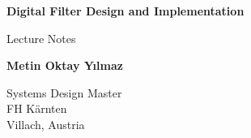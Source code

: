 \begin{titlepage}
	\begin{center}
		\vspace*{1cm}

		\textbf{\Large Digital Filter Design and Implementation}

		\vspace{0.5cm}
		\large Lecture Notes

		\vspace{1.5cm}

		\textbf{Metin Oktay Yılmaz}

		\vspace{15cm}


		Systems Design Master\\
		FH K\"arnten\\
		Villach, Austria\\
	\end{center}
\end{titlepage}
